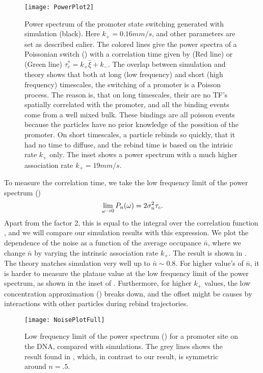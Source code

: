 \begin{figure}
\texttt{[image: PowerPlot2]}
\caption{ Power spectrum of the promoter state switching generated with simulation (black). Here $k_+=0.16mm/s$, and other parameters are set as described ealier. The colored lines give the power spectra of a Poissonian switch () with a correlation time given by (Red line)  or (Green line) $\tau_c^*=k_+ \bar{\xi}+k_-$. The overlap between simulation and theory shows that both at long (low frequency) and short (high frequency) timescales, the switching of a promoter is a Poisson process. The reason is, that on long timescales, their are no TF's spatially correlated with the promoter, and all the binding events come from a well mixed bulk. These bindings are all poisson events because the particles have no prior knowledge of the possition of the promoter. On short timescales, a particle rebinds so quickly, that it had no time to diffuse, and the rebind time is based on the intrisic rate $k_+$ only. The inset shows a power spectrum with a much higher association rate $k_+=19 mm/s$. 
}
\end{figure}

To measure the correlation time, we take the low frequency limit of the power spectrum ()
\begin{equation}
 \lim_{\omega\to0} P_n(\omega) = 2 \sigma_n^2 \tau_c.
 \elabel{PowPro}
\end{equation}
Apart from the factor 2, this is equal to the integral over the correlation function , and we will compare our simulation results with this expression. We plot the dependence of the noise as a function of the average occupance $\bar{n}$, where we change $\bar{n}$ by varying the intrinsic association rate $k_+$. The result is shown in . The theory matches simulation very well up to $\bar{n}\sim0.8$. For higher value's of $\bar{n}$, it is harder to measure the plataue value at the low frequency limit of the power spectrum, as shown in the inset of . Furthermore, for higher $k_+$ values, the low concentration approximation () breaks down, and the offset might be causes by interactions with other particles during rebind trajectories.

\begin{figure}
\centering
\texttt{[image: NoisePlotFull]}
\caption{ Low frequency limit of the power spectrum () for a promoter site on the DNA, compared with simulations. The grey lines shows the result found in \cite{Tkacik2009}, which, in contrast to our result, is symmetric around $n=.5$.}
\end{figure}




